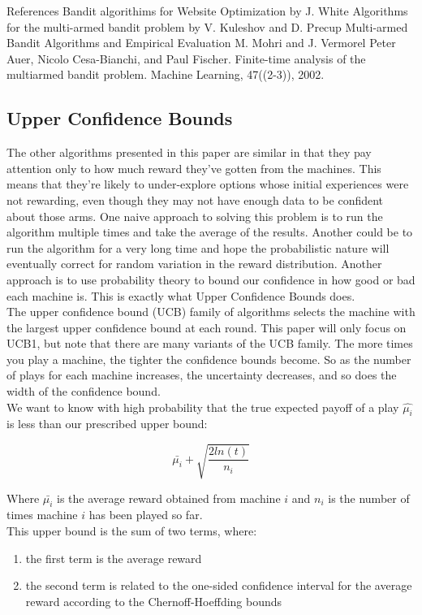\documentclass{article}
\begin{document}
References
Bandit algorithims for Website Optimization by J. White
Algorithms for the multi-armed bandit problem by V. Kuleshov and D. Precup
Multi-armed Bandit Algorithms and Empirical Evaluation M. Mohri and J. Vermorel
Peter Auer, Nicolo Cesa-Bianchi, and Paul Fischer. Finite-time analysis of the multiarmed bandit problem. Machine Learning, 47((2-3)), 2002.

\subsection{Upper Confidence Bounds}

The other algorithms presented in this paper are similar in that they pay attention only to how much reward they’ve gotten from the machines. This means that they're likely to under-explore options whose initial experiences were not rewarding, even though they may not have enough data to be confident about those arms. One naive approach to solving this problem is to run the algorithm multiple times and take the average of the results. Another could be to run the algorithm for a very long time and hope the probabilistic nature will eventually correct for random variation in the reward distribution. Another approach is to use probability theory to bound our confidence in how good or bad each machine is. This is exactly what Upper Confidence Bounds does.\\

The upper confidence bound (UCB) family of algorithms selects the machine with the largest upper confidence bound at each round. This paper will only focus on UCB1, but note that there are many variants of the UCB family. The more times you play a machine, the tighter the confidence bounds become. So as the number of plays for each machine increases, the uncertainty decreases, and so does the width of the confidence bound.\\

We want to know with high probability that the true expected payoff of a play $\hat{\mu_i}$ is less than our prescribed upper bound:

$$\bar{\mu_{i}} + \sqrt{\frac{2 ln (t)}{n_i}}$$

Where $\bar{\mu_{i}}$ is the average reward obtained from machine $i$ and $n_i$ is the number of times machine $i$ has been played so far.\\

This upper bound is the sum of two terms, where:

\begin{enumerate}
\item the first term is the average reward
\item the second term is related to the one-sided confidence interval for the average reward according to the Chernoff-Hoeffding bounds
\end{enumerate}
\end{document}

